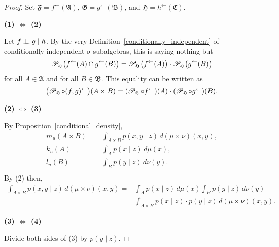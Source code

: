 \documentclass[
twoside=true,
paper=letter,
fontsize=9pt,
pagesize=auto,
leqno,
openany,
headsepline,
overfullrule,
]{scrbook}
\theoremstyle{plain}
\theoremstyle{plain}
\theoremstyle{definition}
\theoremstyle{bfnoteitalic}
\theoremstyle{bfnoteroman}
\newcommand{\sigalg}[1]{\mathfrak{#1}}
\newcommand{\cali}[1]{\mathscr{#1}}
\newcommand{\condprobsub}[2]
{\mathop{\cali{P}\hspace{-1.5pt}}\nolimits_{#2}\hspace{-1pt}\left(#1\right)}
\newcommand{\condprobop}[1]{\mathop{\cali{P}\hspace{-1pt}}\nolimits_{#1}}
\newcommand{\textsigma}{\hbox{\large{$\sigma$}}\kern-1pt}
\newcommand{\preimage}[1]{#1^{\leftarrow}}
\newcommand{\meets}{\cap}
\newcommand{\sigmaalgebra}{\sigalg{A}}
\newcommand{\sigmaalgebraii}{\sigalg{B}}
\newcommand{\sigmaalgebraiii}{\sigalg{C}}
\newcommand{\lilstrut}{\vphantom{\bigl(}}
\newcommand{\funcf}{f}
\newcommand{\funcg}{g}
\newcommand{\funch}{h}
\newcommand{\funck}{k}
\newcommand{\funcl}{l}
\newcommand{\funcm}{m}
\newcommand{\function}{f}
\newcommand{\functionii}{g}
\newcommand{\functioniii}{h}
\newcommand{\mspaceelt}{x}
\newcommand{\mspaceeltii}{y}
\newcommand{\mspaceeltiii}{z}
\newcommand{\measmu}{\mu}
\newcommand{\measnu}{\nu}
\newcommand{\seti}{A}
\newcommand{\setii}{B}
\newcommand{\uspaceelt}{u}
\newcommand{\condindep}[3]{#1\perp\kern-6pt\perp #2\mid #3}
\begin{document}
\begin{proof}
Set 
$\sigalg{F}=\preimage{\funcf}(\sigmaalgebra)$, 
$\sigalg{G}=\preimage{\funcg}(\sigmaalgebraii)$, and 
$\sigalg{H}=\preimage{\funch}(\sigmaalgebraiii)$.
 
\noindent
\textbf{(1) $\Leftrightarrow$ (2)}

Let
$\condindep{\function}{\functionii}{\functioniii}$. 
By the very Definition~\ref{conditionally_independent} of conditionally independent \textsigma\hyp{}subalgebras,
this is saying nothing but
\begin{equation}
\condprobsub{\lilstrut\preimage{\funcf}(\seti) \meets \preimage{\funcg}(\setii)}{\sigalg{H}}
=
\condprobsub{\lilstrut\preimage{\funcf}(\seti)}{\sigalg{H}}
\cdot
\condprobsub{\lilstrut\preimage{\funcg}(\setii)}{\sigalg{H}}
\end{equation}
for all $\seti\in\sigmaalgebra$ and for all $\setii\in\sigmaalgebraii$.
This equality can be written as
\begin{equation}
\bigl(\condprobop{\sigalg{H}} \circ \preimage{(\funcf,\funcg)} \bigr)
(\seti\times\setii)
=
(\condprobop{\sigalg{H}}\circ \preimage{\funcf})(\seti)
\cdot
(\condprobop{\sigalg{H}}\circ \preimage{\funcg})(\setii).
\end{equation}

\noindent
\textbf{(2) $\Leftrightarrow$ (3)}

By Proposition~\ref{conditional_density},
\begin{align*}
\funcm_\uspaceelt
(\seti\times\setii)
= &
\int_{\seti\times\setii}
p(\mspaceelt,\mspaceeltii\mid\mspaceeltiii)
\,d(\measmu\times\measnu)(\mspaceelt,\mspaceeltii),
\\
\funck_\uspaceelt
(\seti)
= &
\int_\seti p(\mspaceelt\mid\mspaceeltiii)
\, d\measmu(\mspaceelt),
\\
\funcl_\uspaceelt
(\setii)
= &
\int_\setii p(\mspaceeltii\mid\mspaceeltiii)
\, d\measnu(\mspaceeltii).
\\
\end{align*}
By (2) then,
\begin{align*}
\int_{\seti\times\setii}
p(\mspaceelt,\mspaceeltii\mid\mspaceeltiii)
\,d(\measmu\times\measnu)(\mspaceelt,\mspaceeltii)
= &
\int_\seti p(\mspaceelt\mid\mspaceeltiii)
\, d\measmu(\mspaceelt)
\int_\setii p(\mspaceeltii\mid\mspaceeltiii)
\, d\measnu(\mspaceeltii)
\\
= &
\int_{\seti\times\setii}
p(\mspaceelt\mid\mspaceeltiii)\cdot
p(\mspaceeltii\mid\mspaceeltiii)
\, d(\measmu\times\measnu)(\mspaceelt,\mspaceeltii).
\end{align*}

\noindent
\textbf{(3) $\Leftrightarrow$ (4)}

Divide both sides of (3) by $p(\mspaceeltii\mid\mspaceeltiii)$.
\end{proof}
\end{document}
